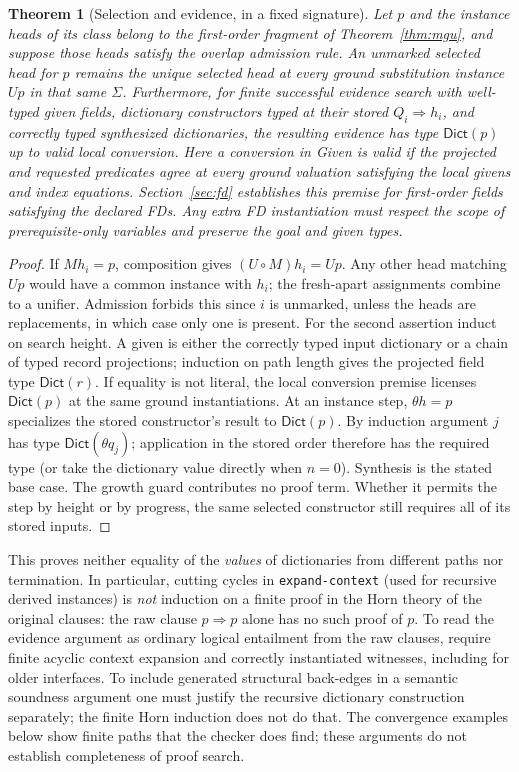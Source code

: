 \documentclass[11pt]{article}
\newtheorem{theorem}{Theorem}[section]
\theoremstyle{definition}
\newcommand{\src}[1]{\nolinkurl{#1}}
\newcommand{\Dict}{\mathsf{Dict}}
\begin{document}
\begin{theorem}[Selection and evidence, in a fixed signature]\label{thm:evidence}
Let $p$ and the instance heads of its class belong to the first-order
fragment of Theorem~\ref{thm:mgu}, and suppose those heads satisfy the
overlap admission rule. An unmarked selected head for $p$ remains the
unique selected head at every ground substitution instance $Up$ in that
\emph{same} $\Sigma$. Furthermore, for finite successful evidence search
with well-typed given fields, dictionary constructors typed at their
stored $Q_i\Rightarrow h_i$, and correctly typed synthesized dictionaries,
the resulting evidence has type $\Dict(p)$ up to valid local conversion.
Here a conversion in \textsf{Given} is valid if the projected and requested
predicates agree at every ground valuation satisfying the local givens
and index equations. Section~\ref{sec:fd} establishes this premise
for first-order fields satisfying the declared FDs.
Any extra FD instantiation must respect the scope of
prerequisite-only variables and preserve the goal and given types.
\end{theorem}
\begin{proof}
If $Mh_i=p$, composition gives $(U\circ M)h_i=Up$. Any other head matching
$Up$ would have a common instance with $h_i$; the fresh-apart assignments
combine to a unifier. Admission forbids this since $i$ is unmarked, unless
the heads are replacements, in which case only one is present. For the
second assertion induct on search height. A given is either the correctly
typed input dictionary or a chain of typed record projections; induction
on path length gives the projected field type $\Dict(r)$. If equality is
not literal, the local conversion premise licenses $\Dict(p)$ at the
same ground instantiations. At an instance step,
$\theta h=p$ specializes the stored constructor's result to $\Dict(p)$.
By induction argument $j$ has type $\Dict(\theta q_j)$; application in
the stored order therefore has the required type (or take the dictionary
value directly when $n=0$). Synthesis is the stated base case.
The growth guard contributes no proof term. Whether it permits the step
by height or by progress, the same selected constructor still requires
all of its stored inputs.
\end{proof}
This proves neither equality of the \emph{values} of dictionaries from
different paths nor termination. In particular, cutting cycles in
\src{expand-context} (used for recursive derived instances) is \emph{not}
induction on a finite proof in the Horn theory of the original clauses:
the raw clause $p\Rightarrow p$ alone has no such proof of $p$. To read
the evidence argument as ordinary logical entailment from the raw clauses,
require finite acyclic context expansion and correctly instantiated
witnesses, including for older interfaces. To include generated structural
back-edges in a semantic soundness argument one must justify the recursive
dictionary construction separately; the finite Horn induction does not do
that. The convergence examples below show finite paths that the checker
does find; these arguments do not establish completeness of proof search.
\end{document}

